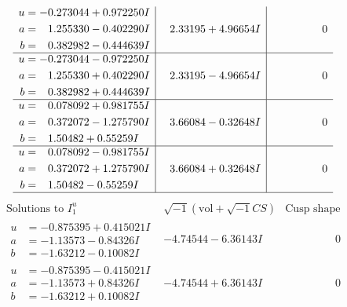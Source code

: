 \documentclass[1p]{elsarticle_modified}
\theoremstyle{definition}
\newcommand{\I}{\sqrt{-1}}
\begin{document}
$$\begin{array}{c|c|c}
\begin{aligned}
u &= -0.273044 + 0.972250 I \\
a &= \phantom{-}1.255330 - 0.402290 I \\
b &= \phantom{-}0.382982 - 0.444639 I\end{aligned}
 & \phantom{-}2.33195 + 4.96654 I & \phantom{-0.000000 } 0 \\ \hline\begin{aligned}
u &= -0.273044 - 0.972250 I \\
a &= \phantom{-}1.255330 + 0.402290 I \\
b &= \phantom{-}0.382982 + 0.444639 I\end{aligned}
 & \phantom{-}2.33195 - 4.96654 I & \phantom{-0.000000 } 0 \\ \hline\begin{aligned}
u &= \phantom{-}0.078092 + 0.981755 I \\
a &= \phantom{-}0.372072 - 1.275790 I \\
b &= \phantom{-}1.50482 + 0.55259 I\end{aligned}
 & \phantom{-}3.66084 - 0.32648 I & \phantom{-0.000000 } 0 \\ \hline\begin{aligned}
u &= \phantom{-}0.078092 - 0.981755 I \\
a &= \phantom{-}0.372072 + 1.275790 I \\
b &= \phantom{-}1.50482 - 0.55259 I\end{aligned}
 & \phantom{-}3.66084 + 0.32648 I & \phantom{-0.000000 } 0\\
 \hline 
 \end{array}$$\newpage$$\begin{array}{c|c|c}  
\text{Solutions to }I^u_{1}& \I (\text{vol} + \sqrt{-1}CS) & \text{Cusp shape}\\
 \hline 
\begin{aligned}
u &= -0.875395 + 0.415021 I \\
a &= -1.13573 - 0.84326 I \\
b &= -1.63212 - 0.10082 I\end{aligned}
 & -4.74544 - 6.36143 I & \phantom{-0.000000 } 0 \\ \hline\begin{aligned}
u &= -0.875395 - 0.415021 I \\
a &= -1.13573 + 0.84326 I \\
b &= -1.63212 + 0.10082 I\end{aligned}
 & -4.74544 + 6.36143 I & \phantom{-0.000000 } 0 \\ \hline\begin{aligned}

\end{aligned}
\end{array}$$
\end{document}
